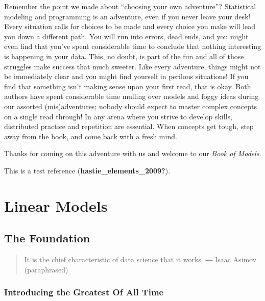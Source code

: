 \documentclass[
  letterpaper,
]{krantz}
\begin{document}
Remember the point we made about ``choosing your own adventure''?
Statistical modeling and programming is an adventure, even if you never
leave your desk! Every situation calls for choices to be made and every
choice you make will lead you down a different path. You will run into
errors, dead ends, and you might even find that you've spent
considerable time to conclude that nothing interesting is happening in
your data. This, no doubt, is part of the fun and all of those struggles
make success that much sweeter. Like every adventure, things might not
be immediately clear and you might find yourself in perilous situations!
If you find that something isn't making sense upon your first read, that
is okay. Both authors have spent considerable time mulling over models
and foggy ideas during our assorted (mis)adventures; nobody should
expect to master complex concepts on a single read through! In any arena
where you strive to develop skills, distributed practice and repetition
are essential. When concepts get tough, step away from the book, and
come back with a fresh mind.

Thanks for coming on this adventure with us and welcome to our
\emph{Book of Models}.

This is a test reference (\textbf{hastie\_elements\_2009?}).

\part{Linear Models}

\chapter{The Foundation}\label{sec-foundation}

\begin{quote}
It is the chief characteristic of data science that it works. ― Isaac
Asimov (paraphrased)
\end{quote}

\section{Introducing the Greatest Of All Time}\label{sec-goat}
\end{document}
